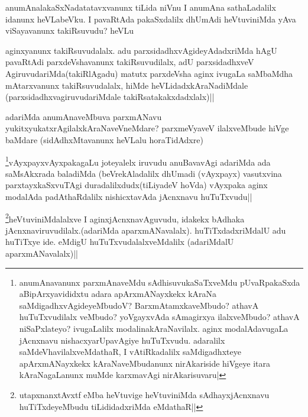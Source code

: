 \begin{artha}
anumAnalakaSxNadatatavxvanunx tiLida niVnu  I anumAna sathaLadalilx idanunx heVLabeVku. I pavaRtAda pakaSxdalilx dhUmAdi heVtuviniMda yAva viSayavanunx takiRsuvudu? heVLu
\end{artha}

\begin{artha}
aginxyanunx takiRsuvudalalx. adu parxsidadhxvAgideyAdadxriMda hAgU pavaRtAdi parxdeVshavanunx takiRsuvudilalx, adU parxsidadhxveV AgiruvudariMda(takiRlAgadu) matutx parxdeVsha aginx ivugaLa saMbaMdha mAtarxvanunx takiRsuvudalalx, hiMde heVLidadxkAraNadiMdale (parxsidadhxvagiruvudariMdale takiRsatakakxdadxlalx)||
\end{artha}


\begin{artha}
adariMda anumAnaveMbuva parxmANavu yukitxyukatxrAgilalxkAraNaveVneMdare? parxmeVyaveV ilalxveMbude hiVge baMdare (sidAdhxMtavanunx heVLalu horaTidAdxre)
\end{artha}

\begin{artha}
\footnote{anumAnavanunx parxmAnaveMdu sAdhisuvukaSaTxveMdu pUvaRpakaSxda aBipArxyavididxtu adara apArxmANayxkekx kAraNa saMdigadhxvAgideyeMbudoV? BarxmAtamxkaveMbudo? athavA huTuTxvudilalx veMbudo? yoVgayxvAda sAmagirxya ilalxveMbudo? athavA niSaPxlateyo? ivugaLalilx modalinakAraNavilalx. aginx modalAdavugaLa jAcnxnavu nishacxyarUpavAgiye huTuTxvudu. adaralilx saMdeVhavilalxveMdathaR, I vAtiRkadalilx saMdigadhxteye apArxmANayxkekx kAraNaveMbudanunx nirAkariside hiVgeye itara kAraNagaLanunx muMde karxmavAgi nirAkarisuvaru|}vAyxpayxvAyxpakagaLu joteyalelx iruvudu anuBavavAgi adariMda ada saMsAkxrada baladiMda (beVrekAladalilx dhUmadi (vAyxpayx) vasutxvina parxtayxkaSxvuTAgi duradalilxdudx(tiLiyadeV hoVda) vAyxpaka aginx modalAda padAthaRdalilx nishicxtavAda jAcnxnavu huTuTxvudu||
\end{artha}

\begin{artha}
\footnote{utapxnanxtAvxtf eMba heVtuvige heVtuviniMda sAdhayxjAcnxnavu huTiTxdeyeMbudu tiLididadxriMda eMdathaR||}heVtuviniMdalalxve  I aginxjAcnxnavAguvudu, idakekx bAdhaka jAcnxnaviruvudilalx.(adariMda aparxmANavalalx). huTiTxdadxriMdalU adu huTiTxye ide. eMdigU huTuTxvudalalxveMdalilx (adariMdalU aparxmANavalalx)||
\end{artha}

